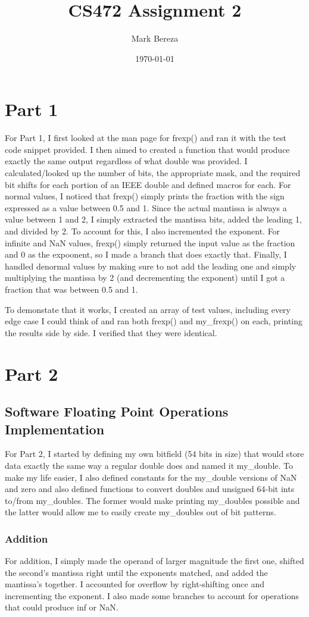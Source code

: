 \documentclass[12pt]{article}%
\begin{document}
\title{CS472 Assignment 2}
\author{Mark Bereza}
\date{\today}
\maketitle
\section{Part 1}
For Part 1, I first looked at the man page for frexp() and ran it with the test code snippet provided. I then aimed to created a function that would produce exactly the same output regardless of what double was provided. I calculated/looked up the number of bits, the appropriate mask, and the required bit shifts for each portion of an IEEE double and defined macros for each. For normal values, I noticed that frexp() simply prints the fraction with the sign expressed as a value between 0.5 and 1. Since the actual mantissa is always a value between 1 and 2, I simply extracted the mantissa bits, added the leading 1, and divided by 2. To account for this, I also incremented the exponent. For infinite and NaN values, frexp() simply returned the input value as the fraction and 0 as the expoonent, so I made a branch that does exactly that. Finally, I handled denormal values by making sure to not add the leading one and simply multiplying the mantissa by 2 (and decrementing the exponent) until I got a fraction that was between 0.5 and 1.

To demonstate that it works, I created an array of test values, including every edge case I could think of and ran both frexp() and my_frexp() on each, printing the results side by side. I verified that they were identical.
\section{Part 2}
\subsection{Software Floating Point Operations Implementation}
For Part 2, I started by defining my own bitfield (54 bits in size) that would store data exactly the same way a regular double does and named it my_double. To make my life easier, I also defined constants for the my_double versions of NaN and zero and also defined functions to convert doubles and unsigned 64-bit ints to/from my_doubles. The former would make printing my_doubles possible and the latter would allow me to easily create my_doubles out of bit patterns.
\subsubsection{Addition}
For addition, I simply made the operand of larger magnitude the first one, shifted the second's mantissa right until the exponents matched, and added the mantissa's together. I accounted for overflow by right-shifting once and incrementing the exponent. I also made some branches to account for operations that could produce inf or NaN.
\end{document}
